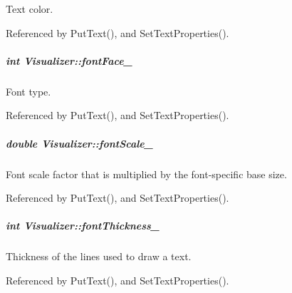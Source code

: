 Text color. 



Referenced by Put\-Text(), and Set\-Text\-Properties().

\hypertarget{group___core_a0aa6d2b6b8db04a4242fbfec555c88d1}{
\subparagraph[{font\-Face\-\_\-}]{\setlength{\rightskip}{0pt plus 5cm}int Visualizer\-::font\-Face\-\_\-\hspace{0.3cm}{\ttfamily [private]}}}\label{group___core_a0aa6d2b6b8db04a4242fbfec555c88d1}


Font type. 



Referenced by Put\-Text(), and Set\-Text\-Properties().

\hypertarget{group___core_a9b91ed2be01274b57be07c01545ff802}{
\subparagraph[{font\-Scale\-\_\-}]{\setlength{\rightskip}{0pt plus 5cm}double Visualizer\-::font\-Scale\-\_\-\hspace{0.3cm}{\ttfamily [private]}}}\label{group___core_a9b91ed2be01274b57be07c01545ff802}


Font scale factor that is multiplied by the font-\/specific base size. 



Referenced by Put\-Text(), and Set\-Text\-Properties().

\hypertarget{group___core_a5438944d7404d76256e5d0fb4ddecdaf}{
\subparagraph[{font\-Thickness\-\_\-}]{\setlength{\rightskip}{0pt plus 5cm}int Visualizer\-::font\-Thickness\-\_\-\hspace{0.3cm}{\ttfamily [private]}}}\label{group___core_a5438944d7404d76256e5d0fb4ddecdaf}


Thickness of the lines used to draw a text. 



Referenced by Put\-Text(), and Set\-Text\-Properties().

